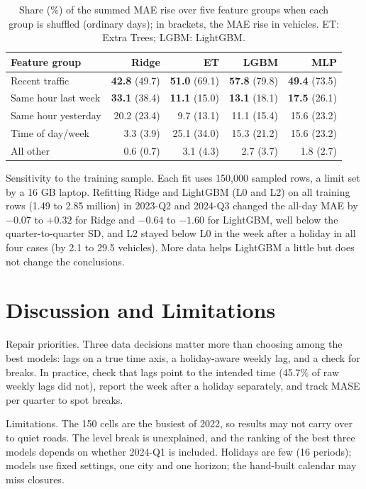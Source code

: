 \documentclass[sigconf]{acmart}
\begin{document}
\begin{table}[t]
  \caption{Share (\%) of the summed MAE rise over five feature groups when each group is shuffled (ordinary days); in brackets, the MAE rise in vehicles. ET: Extra Trees; LGBM: LightGBM.}
  \label{tab:impact}
  \small
  \setlength{\tabcolsep}{2.5pt}
  \begin{tabular}{lrrrr}
    \toprule
    Feature group & Ridge & ET & LGBM & MLP \\
    \midrule
    Recent traffic      & \textbf{42.8} (49.7) & \textbf{51.0} (69.1) & \textbf{57.8} (79.8) & \textbf{49.4} (73.5) \\
    Same hour last week & \textbf{33.1} (38.4) & \textbf{11.1} (15.0) & \textbf{13.1} (18.1) & \textbf{17.5} (26.1) \\
    Same hour yesterday & 20.2 (23.4) & 9.7 (13.1)  & 11.1 (15.4) & 15.6 (23.2) \\
    Time of day/week    & 3.3 (3.9)   & 25.1 (34.0) & 15.3 (21.2) & 15.6 (23.2) \\
    All other           & 0.6 (0.7)   & 3.1 (4.3)   & 2.7 (3.7)   & 1.8 (2.7) \\
    \bottomrule
  \end{tabular}
\end{table}

Sensitivity to the training sample. Each fit uses 150{,}000 sampled rows, a limit set by a 16 GB laptop. Refitting Ridge and LightGBM (L0 and L2) on all training rows (1.49 to 2.85 million) in 2023-Q2 and 2024-Q3 changed the all-day MAE by $-0.07$ to $+0.32$ for Ridge and $-0.64$ to $-1.60$ for LightGBM, well below the quarter-to-quarter SD, and L2 stayed below L0 in the week after a holiday in all four cases (by 2.1 to 29.5 vehicles). More data helps LightGBM a little but does not change the conclusions.

\section{Discussion and Limitations}
Repair priorities. Three data decisions matter more than choosing among the best models: lags on a true time axis, a holiday-aware weekly lag, and a check for breaks. In practice, check that lags point to the intended time (45.7\% of raw weekly lags did not), report the week after a holiday separately, and track MASE per quarter to spot breaks.

Limitations. The 150 cells are the busiest of 2022, so results may not carry over to quiet roads. The level break is unexplained, and the ranking of the best three models depends on whether 2024-Q1 is included. Holidays are few (16 periods); models use fixed settings, one city and one horizon; the hand-built calendar may miss closures.
\end{document}
